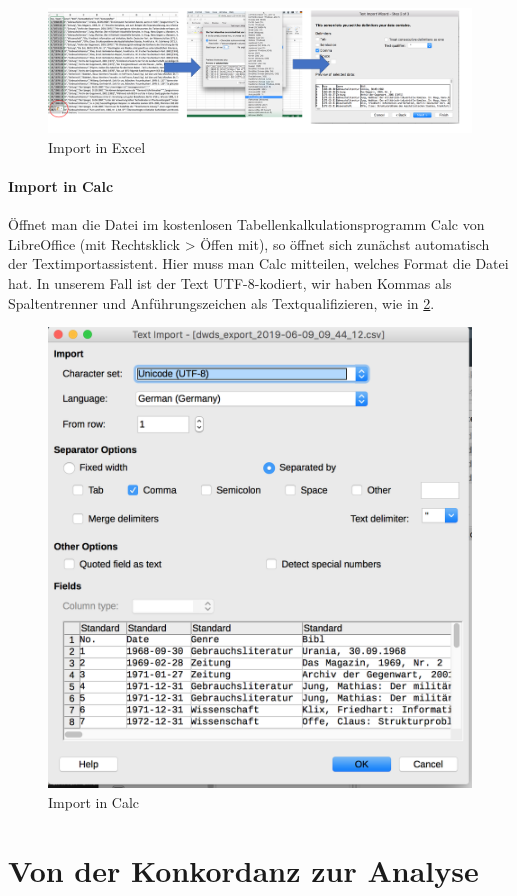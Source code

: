 \documentclass[]{article}
\let\oldparagraph\paragraph
\renewcommand{\paragraph}[1]{\oldparagraph{#1}\mbox{}}
\begin{document}
\begin{figure}
\includegraphics[width=6.66in]{docs/fig/import_in_excel} \caption{Import in Excel}\label{fig:importexcel}
\end{figure}

\hypertarget{import-in-calc}{\paragraph{Import in
Calc}\label{import-in-calc}}

Öffnet man die Datei im kostenlosen Tabellenkalkulationsprogramm Calc
von LibreOffice (mit Rechtsklick \textgreater{} Öffen mit), so öffnet
sich zunächst automatisch der Textimportassistent. Hier muss man Calc
mitteilen, welches Format die Datei hat. In unserem Fall ist der Text
UTF-8-kodiert, wir haben Kommas als Spaltentrenner und Anführungszeichen
als Textqualifizieren, wie in \ref{fig:calcimport}.

\begin{figure}
\includegraphics[width=0.5\linewidth,height=0.5\textheight]{docs/fig/calc_import} \caption{Import in Calc}\label{fig:calcimport}
\end{figure}

\section{Von der Konkordanz zur
Analyse}\label{von-der-konkordanz-zur-analyse}
\end{document}
